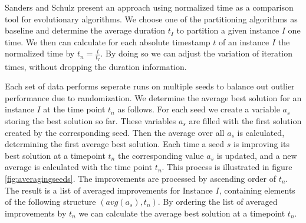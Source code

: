 \documentclass[a4paper,12pt,titlepage, BCOR7mm,headsepline]{scrbook}
\numberwithin{equation}{section}
\begin{document}
% 
Sanders and Schulz \cite{sanders2012distributed} present an approach using normalized time as a comparison tool for evolutionary algorithms. We choose one of the partitioning algorithms as baseline and determine the average duration $t_I$ to partition a given instance $I$ one time. We then can calculate for each absolute timestamp $t$ of an instance $I$ the normalized time by $t_n = \frac{t}{t_I}$. By doing so we can adjust the variation of iteration times, without dropping the duration information. 

Each set of data performs seperate runs on multiple seeds to balance out outlier performance due to randomization. We determine the average best solution for an instance $I$ at the time point $t_n$ as follows. For each seed we create a variable $a_s$ storing the best solution so far. These variables $a_s$ are filled with the first solution created by the corresponding seed. Then the average over all $a_s$ is calculated, determining the first average best solution. Each time a seed $s$ is improving its best solution at a timepoint $t_n$ the corresponding value $a_s$ is updated, and a new average is calculated with the time point $t_n$. This process is illustrated in figure \ref{fig:averagingseeds}. The improvements are processed by ascending order of $t_n$. The result is a list of averaged improvements for Instance $I$, containing elements of the following structure $(avg(a_s), t_n)$. By ordering the list of averaged improvements by $t_n$ we can calculate the average best solution at a timepoint $t_n$.
\end{document}
